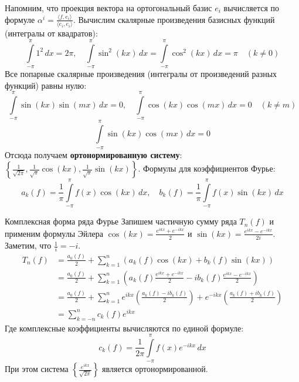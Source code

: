 \documentclass[12pt,a4paper]{article}
\begin{document}
Напомним, что проекция вектора на ортогональный базис $e_i$ вычисляется по формуле $\alpha^i = \frac{\langle f, e_i \rangle}{\langle e_i, e_i \rangle}$.
Вычислим скалярные произведения базисных функций (интегралы от квадратов):
$$ \int\limits_{-\pi}^\pi 1^2 \, dx = 2\pi, \quad \int\limits_{-\pi}^\pi \sin^2(kx) \, dx = \int\limits_{-\pi}^\pi \cos^2(kx) \, dx = \pi \quad (k \neq 0) $$
Все попарные скалярные произведения (интегралы от произведений разных функций) равны нулю:
$$ \int\limits_{-\pi}^\pi \sin(kx)\sin(mx) \, dx = 0, \quad \int\limits_{-\pi}^\pi \cos(kx)\cos(mx) \, dx = 0 \quad (k \neq m) $$
$$ \int\limits_{-\pi}^\pi \sin(kx)\cos(mx) \, dx = 0 $$
Отсюда получаем \textbf{ортонормированную систему}: $\left\{ \frac{1}{\sqrt{2\pi}}, \frac{1}{\sqrt{\pi}}\cos(kx), \frac{1}{\sqrt{\pi}}\sin(kx) \right\}$.
Формулы для коэффициентов Фурье:
$$ a_k(f) = \frac{1}{\pi} \int\limits_{-\pi}^\pi f(x) \cos(kx) \, dx, \quad b_k(f) = \frac{1}{\pi} \int\limits_{-\pi}^\pi f(x) \sin(kx) \, dx $$

\begin{Definition}{Комплексная форма ряда Фурье}{}
Запишем частичную сумму ряда $T_n(f)$ и применим формулы Эйлера $\cos(kx) = \frac{e^{ikx} + e^{-ikx}}{2}$ и $\sin(kx) = \frac{e^{ikx} - e^{-ikx}}{2i}$. Заметим, что $\frac{1}{i} = -i$.
\begin{align*}
    T_n(f) &= \frac{a_0(f)}{2} + \sum\limits_{k=1}^n \left( a_k(f) \cos(kx) + b_k(f) \sin(kx) \right) \\
    &= \frac{a_0(f)}{2} + \sum\limits_{k=1}^n \left( a_k(f) \frac{e^{ikx} + e^{-ikx}}{2} - i b_k(f) \frac{e^{ikx} - e^{-ikx}}{2} \right) \\
    &= \frac{a_0(f)}{2} + \sum\limits_{k=1}^n e^{ikx} \left( \frac{a_k(f) - i b_k(f)}{2} \right) + e^{-ikx} \left( \frac{a_k(f) + i b_k(f)}{2} \right) \\
    &= \sum\limits_{k=-n}^n c_k(f) e^{ikx}
\end{align*}
Где комплексные коэффициенты вычисляются по единой формуле:
$$ c_k(f) = \frac{1}{2\pi} \int\limits_{-\pi}^\pi f(x) e^{-ikx} \, dx $$
При этом система $\left\{ \frac{e^{ikx}}{\sqrt{2\pi}} \right\}$ является ортонормированной.
\end{Definition}
\end{document}
